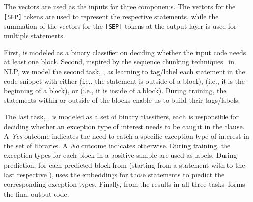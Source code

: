 

The vectors are used as the inputs for three components. The vectors
for the \texttt{[SEP]} tokens are used to represent the respective
statements, while the summation of the vectors for the \texttt{[SEP]} tokens at
the output layer is used for multiple statements.

First, {\xblock} is modeled as a binary classifier on deciding whether
the input code needs at least one  block. Second,
inspired by the sequence chunking
techniques~\cite{sequence-chunking-aaai17} in NLP, we model the second
task, {\xstate}, as learning to tag/label each statement in the code
snippet with either  (i.e., the statement is outside of a
 block),  (i.e., it is the beginning of a
 block), or  (i.e., it is inside of a 
block).
During training, the statements within or outside of the
 blocks enable us to build their tags/labels.

The last task, {\xtype}, is modeled as a set of binary classifiers,
each is responsible for deciding whether an exception type of interest
needs to be caught in the  clause. A {\em Yes} outcome
indicates the need to catch a specific exception type of interest in
the set of libraries. A {\em No} outcome indicates otherwise.  During
training, the exception types for each  block in a
positive sample are used as labels. During prediction, for each
predicted block from {\xstate} (starting from a statement with
 to the last respective ), {\xtype} uses the
embeddings for those statements to predict the corresponding exception
types. Finally, from the results in all three tasks, {\tool} forms the
final output code.

